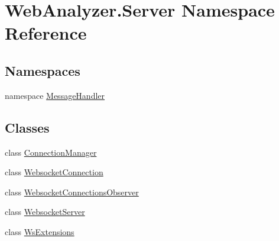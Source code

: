 \hypertarget{namespace_web_analyzer_1_1_server}{}\section{Web\+Analyzer.\+Server Namespace Reference}
\label{namespace_web_analyzer_1_1_server}
\subsection*{Namespaces}
\begin{DoxyCompactItemize}
\item 
namespace \hyperlink{namespace_web_analyzer_1_1_server_1_1_message_handler}{Message\+Handler}
\end{DoxyCompactItemize}
\subsection*{Classes}
\begin{DoxyCompactItemize}
\item 
class \hyperlink{class_web_analyzer_1_1_server_1_1_connection_manager}{Connection\+Manager}
\item 
class \hyperlink{class_web_analyzer_1_1_server_1_1_websocket_connection}{Websocket\+Connection}
\item 
class \hyperlink{class_web_analyzer_1_1_server_1_1_websocket_connections_observer}{Websocket\+Connections\+Observer}
\item 
class \hyperlink{class_web_analyzer_1_1_server_1_1_websocket_server}{Websocket\+Server}
\item 
class \hyperlink{class_web_analyzer_1_1_server_1_1_ws_extensions}{Ws\+Extensions}
\end{DoxyCompactItemize}
